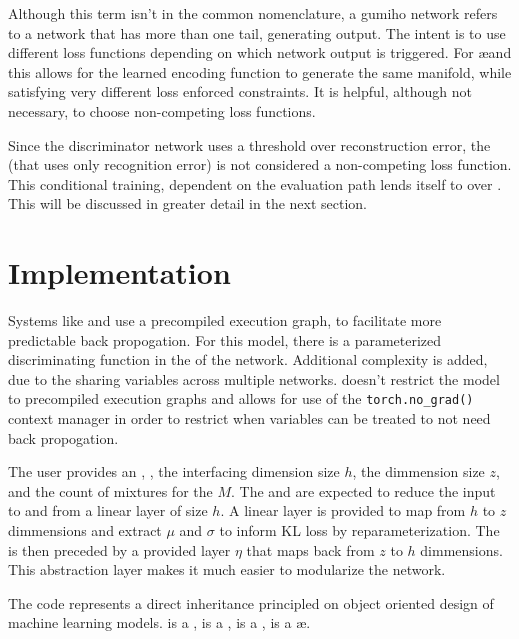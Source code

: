 \documentclass{article}
\begin{document}
\begin{multicols}{2}
Although this term isn't in the common nomenclature, a gumiho network refers to a network
that has more than one tail, generating output. The intent is to use different loss functions depending
on which network output is triggered. For \ae and \vae this allows for the learned
encoding function to generate the same manifold, while satisfying very different loss
enforced constraints. It is helpful, although not necessary, to choose non-competing
loss functions.

\resizebox{\columnwidth}{!}{}

Since the discriminator network uses a threshold over reconstruction error, the \vae
(that uses only recognition error) is not considered a non-competing loss function.
This conditional training, dependent on the evaluation path lends itself to \pytorch
over \keras. This will be discussed in greater detail in the next section.


\section{Implementation}

Systems like \keras and \tensorflow use a precompiled execution graph, to facilitate
more predictable back propogation. For this model, there is a parameterized
discriminating function in the \bottle of the network. Additional complexity is added,
due to the sharing \encoder variables across multiple \decoder networks. \pytorch doesn't
restrict the model to precompiled execution graphs and allows for use of the
\texttt{torch.no\_grad()} context manager in order to restrict when variables can be
treated to not need back propogation.

The user provides an \encoder, \decoder, the interfacing dimension size $h$,
the \bottle dimmension size $z$, and the count of mixtures for the \GMM $M$. The \encoder
and \decoder are expected to reduce the input to and from a linear layer of size $h$.
A linear \bottle layer is provided to map from $h$ to $z$
dimmensions and extract $\mu$ and $\sigma$ to inform KL loss by reparameterization. The
\decoder is then preceded by a provided layer $\eta$ that maps back from $z$ to $h$
dimmensions. This abstraction layer makes it much easier to modularize the network.

The code represents a direct inheritance principled on object oriented design of machine
learning models. \desc is a \condgen, is a \gumiho, is a \vae, is a \ae.

\subsection{\gumiho}


\end{multicols}
\end{document}
